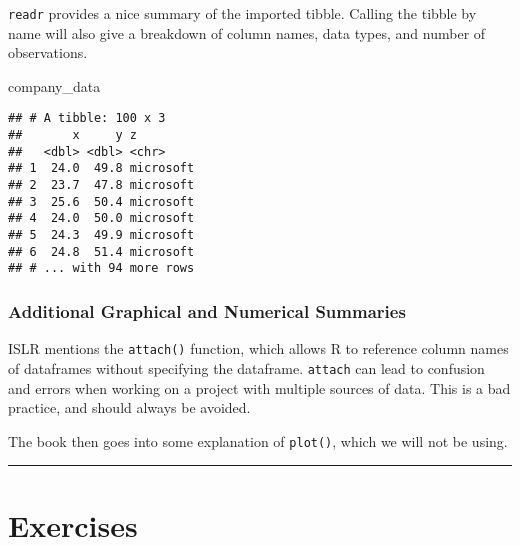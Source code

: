 \documentclass[]{book}
\newenvironment{Shaded}{\begin{snugshade}}{\end{snugshade}}
\newcommand{\NormalTok}[1]{#1}
\theoremstyle{definition}
\theoremstyle{definition}
\theoremstyle{definition}
\theoremstyle{remark}
\begin{document}
\texttt{readr} provides a nice summary of the imported tibble. Calling
the tibble by name will also give a breakdown of column names, data
types, and number of observations.

\begin{Shaded}
\begin{Highlighting}[]
\NormalTok{company_data}
\end{Highlighting}
\end{Shaded}

\begin{verbatim}
## # A tibble: 100 x 3
##       x     y z        
##   <dbl> <dbl> <chr>    
## 1  24.0  49.8 microsoft
## 2  23.7  47.8 microsoft
## 3  25.6  50.4 microsoft
## 4  24.0  50.0 microsoft
## 5  24.3  49.9 microsoft
## 6  24.8  51.4 microsoft
## # ... with 94 more rows
\end{verbatim}

\subsubsection{Additional Graphical and Numerical
Summaries}\label{additional-graphical-and-numerical-summaries}

ISLR mentions the \texttt{attach()} function, which allows R to
reference column names of dataframes without specifying the dataframe.
\texttt{attach} can lead to confusion and errors when working on a
project with multiple sources of data. This is a bad practice, and
should always be avoided.

The book then goes into some explanation of \texttt{plot()}, which we
will not be using.

\begin{center}\rule{0.5\linewidth}{\linethickness}\end{center}

\section{Exercises}\label{exercises}
\end{document}

